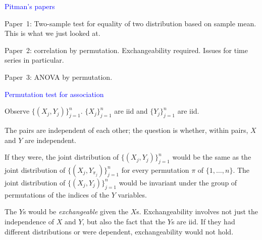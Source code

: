 \documentclass[landscape]{slides}
\begin{document}
\begin{slide}
{\textcolor{blue}{Pitman's papers}}

\cite{pitman37a,pitman37b,pitman37c}

Paper~1: Two-sample test for equality of two distribution based on sample mean.
This is what we just looked at.

Paper~2: correlation by permutation.  Exchangeability required. Issues for time
series in particular.

Paper~3: ANOVA by permutation.

\end{slide}

\begin{slide}
{\textcolor{blue}{Permutation test for association}}

Observe $\{ (X_j, Y_j) \}_{j=1}^n$.
$\{X_j \}_{j=1}^n$ are iid and $\{Y_j \}_{j=1}^n$ are iid.

The pairs are independent of each other; the question is whether, within
pairs, $X$ and $Y$ are independent.

If they were, the joint distribution of $\{ (X_j, Y_j) \}_{j=1}^n$ would
be the same as the joint distribution of $\{ (X_j, Y_{\pi_j}) \}_{j=1}^n$ for 
every permutation $\pi$ of $\{1, \ldots, n\}$.
The joint distribution of $\{ (X_j, Y_j) \}_{j=1}^n$ would be invariant under the
group of permutations of the indices of the $Y$ variables.

The $Y$s would be {\em exchangeable\/} given the $X$s.
Exchangeability involves not just the independence of $X$ and $Y$, but also the
fact that the $Y$s are iid.
If they had different distributions or were dependent, exchangeability would not
hold.

\end{slide}
\end{document}
